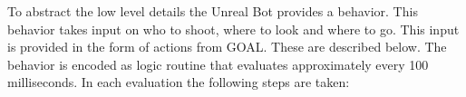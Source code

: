 \documentclass[11pt,a4paper]{article}
\begin{document}


 



To abstract the low level details the Unreal Bot provides a behavior. This behavior takes input on who to shoot, where to look and where to go. This input is provided in the form of actions from GOAL. These are described below. The behavior is encoded as logic routine that evaluates approximately every 100 milliseconds. In each evaluation the following steps are taken:
\end{document}
